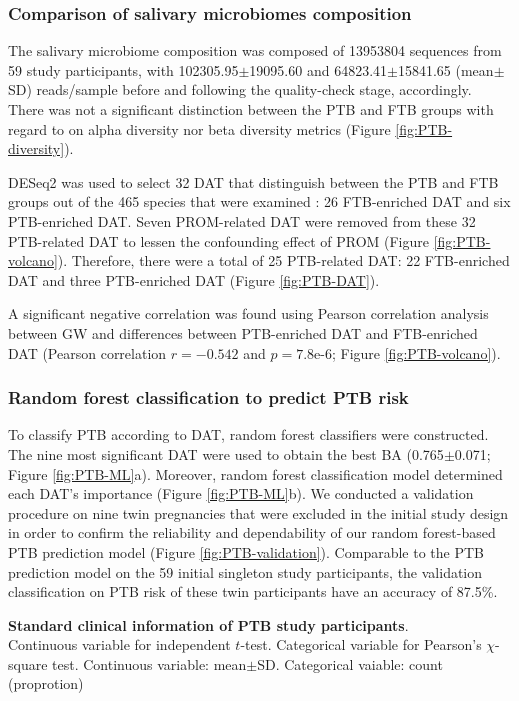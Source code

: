 \documentclass[11pt, a4paper, onecolumn, oneside]{report}
\begin{document}
            \subsubsection{Comparison of salivary microbiomes composition}
                The salivary microbiome composition was composed of 13953804 sequences from 59 study participants, with 102305.95$\pm$19095.60 and 64823.41$\pm$15841.65 (mean$\pm$SD) reads/sample before and following the quality-check stage, accordingly. There was not a significant distinction between the PTB and FTB groups with regard to on alpha diversity nor beta diversity metrics (Figure \ref{fig:PTB-diversity}).

                DESeq2 was used to select 32 DAT that distinguish between the PTB and FTB groups out of the 465 species that were examined \cite{DESeq2-1}: 26 FTB-enriched DAT and six PTB-enriched DAT. Seven PROM-related DAT were removed from these 32 PTB-related DAT to lessen the confounding effect of PROM (Figure \ref{fig:PTB-volcano}). Therefore, there were a total of 25 PTB-related DAT: 22 FTB-enriched DAT and three PTB-enriched DAT (Figure \ref{fig:PTB-DAT}).

                A significant negative correlation was found using Pearson correlation analysis between GW and differences between PTB-enriched DAT and FTB-enriched DAT (Pearson correlation $r = - 0.542$ and $p = 7.8\textrm{e-}6$; Figure \ref{fig:PTB-volcano}).

            \subsubsection{Random forest classification to predict PTB risk}
                To classify PTB according to DAT, random forest classifiers were constructed. The nine most significant DAT were used to obtain the best BA (0.765$\pm$0.071; Figure \ref{fig:PTB-ML}a). Moreover, random forest classification model determined each DAT's importance (Figure \ref{fig:PTB-ML}b). We conducted a validation procedure on nine twin pregnancies that were excluded in the initial study design in order to confirm the reliability and dependability of our random forest-based PTB prediction model (Figure \ref{fig:PTB-validation}). Comparable to the PTB prediction model on the 59 initial singleton study participants, the validation classification on PTB risk of these twin participants have an accuracy of 87.5\%.

            \begin{table}[p]
                \centering
                \caption[Standard clinical information of PTB study participants]{\textbf{Standard clinical information of PTB study participants}. \\
                    Continuous variable for independent $t$-test. Categorical variable for Pearson's $\chi$-square test. Continuous variable: mean$\pm$SD. Categorical vaiable: count (proprotion)}
                    
                \label{tab:PTB-clinical}
            \end{table}
            \clearpage
\end{document}
